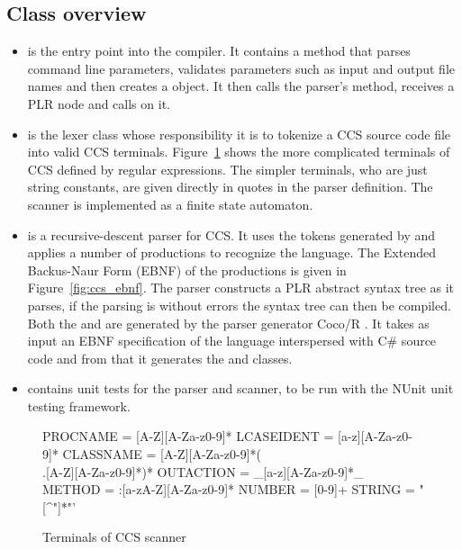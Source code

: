 \subsection{Class overview}\label{ccs_class_overview}
	\begin{itemize}
	
	\item {} is the entry point into the compiler. It contains a 
	 method that parses command line parameters, validates 
	parameters such as input and output file names and then creates a 
	 object. It then calls the parser's  method, 
	receives a PLR  node and calls  on it. 
	
	\item {} is the lexer class whose responsibility it is to 
	tokenize a CCS source code file into valid CCS terminals. 
	Figure~\ref{fig:ccs_terminals} shows the more complicated terminals of CCS 
	defined by regular expressions. The simpler terminals, who are just string 
	constants, are given directly in quotes in the parser definition. The 
	scanner is implemented as a finite state automaton.
	
  \item {} is a recursive-descent parser for CCS. It uses the 
  tokens generated by  and applies a number of 
  productions to recognize the language. The Extended Backus-Naur 
  Form (EBNF) of the productions is given in Figure~\ref{fig:ccs_ebnf}. The 
  parser constructs a PLR abstract syntax tree as it parses, if the parsing is 
  without errors the syntax tree can then be compiled. Both the 
   and  are generated by the parser generator 
  Coco/R \cite{cocor}. It takes as input an EBNF specification of the language 
  interspersed with C\# source code and from that it generates the 
   and  classes. 
	
	\item {} contains unit tests for the parser and scanner, to 
	be run with the NUnit unit testing framework.
	
	\end{itemize}
	
	\begin{figure}
	
\begin{codeblock}
  PROCNAME   = [A-Z][A-Za-z0-9]*
  LCASEIDENT = [a-z][A-Za-z0-9]*
  CLASSNAME  = [A-Z][A-Za-z0-9]*(\\.[A-Z][A-Za-z0-9]*)*
  OUTACTION  = _[a-z][A-Za-z0-9]*_
  METHOD     = :[a-zA-Z][A-Za-z0-9]*
  NUMBER     = [0-9]+
  STRING     = "[^"]*"'
  \end{codeblock}
  \caption{Terminals of CCS scanner}
  \label{fig:ccs_terminals}  
	\end{figure}
	
